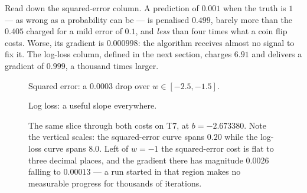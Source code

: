 Read down the squared-error column. A prediction of $0.001$ when the truth is
$1$ --- as wrong as a probability can be --- is penalised $0.499$, barely more
than the $0.405$ charged for a mild error of $0.1$, and \emph{less} than four
times what a coin flip costs. Worse, its gradient is $0.000998$: the algorithm
receives almost no signal to fix it. The log-loss column, defined in the next
section, charges $6.91$ and delivers a gradient of $0.999$, a thousand times
larger.

\begin{figure}[htbp]
  \centering
  \begin{minipage}[t]{0.48\linewidth}
    \centering
    {\scriptsize Squared error: a $0.0003$ drop over $w \in [-2.5,-1.5]$.\par}
  \end{minipage}\hfill
  \begin{minipage}[t]{0.48\linewidth}
    \centering
    {\scriptsize Log loss: a useful slope everywhere.\par}
  \end{minipage}
  \caption{The same slice through both costs on T7, at $b = -2.673380$. Note the
  vertical scales: the squared-error curve spans $0.20$ while the log-loss curve
  spans $8.0$. Left of $w = -1$ the squared-error cost is flat to three decimal
  places, and the gradient there has magnitude $0.0026$ falling to $0.00013$ ---
  a run started in that region makes no measurable progress for thousands of
  iterations.}
  \label{fig:nonconvex}
\end{figure}

